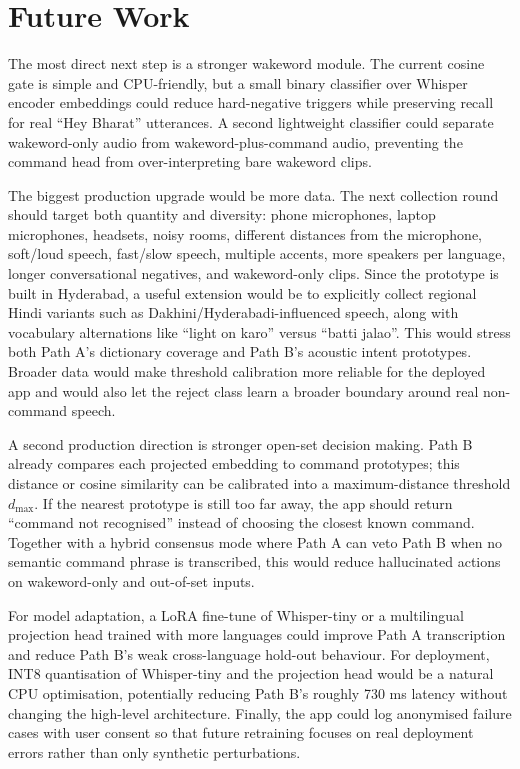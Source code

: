 \documentclass[11pt]{article}
\begin{document}
\section{Future Work}

The most direct next step is a stronger wakeword module. The current cosine
gate is simple and CPU-friendly, but a small binary classifier over Whisper
encoder embeddings could reduce hard-negative triggers while preserving recall
for real ``Hey Bharat'' utterances. A second lightweight classifier could
separate wakeword-only audio from wakeword-plus-command audio, preventing the
command head from over-interpreting bare wakeword clips.

The biggest production upgrade would be more data. The next collection round
should target both quantity and diversity: phone microphones, laptop
microphones, headsets, noisy rooms, different distances from the microphone,
soft/loud speech, fast/slow speech, multiple accents, more speakers per
language, longer conversational negatives, and wakeword-only clips. Since the
prototype is built in Hyderabad, a useful extension would be to explicitly
collect regional Hindi variants such as Dakhini/Hyderabadi-influenced speech,
along with vocabulary alternations like ``light on karo'' versus ``batti
jalao''. This would stress both Path A's dictionary coverage and Path B's
acoustic intent prototypes. Broader data would make threshold calibration more
reliable for the deployed app and would also let the reject class learn a
broader boundary around real non-command speech.

A second production direction is stronger open-set decision making. Path B
already compares each projected embedding to command prototypes; this distance
or cosine similarity can be calibrated into a maximum-distance threshold
$d_{\max}$. If the nearest prototype is still too far away, the app should
return ``command not recognised'' instead of choosing the closest known command.
Together with a hybrid consensus mode where Path A can veto Path B when no
semantic command phrase is transcribed, this would reduce hallucinated actions
on wakeword-only and out-of-set inputs.

For model adaptation, a LoRA fine-tune of Whisper-tiny or a multilingual
projection head trained with more languages could improve Path A transcription
and reduce Path B's weak cross-language hold-out behaviour. For deployment,
INT8 quantisation of Whisper-tiny and the projection head would be a natural
CPU optimisation, potentially reducing Path B's roughly 730 ms latency without
changing the high-level architecture. Finally, the app could log anonymised
failure cases with user consent so that future retraining focuses on real
deployment errors rather than only synthetic perturbations.
\end{document}
